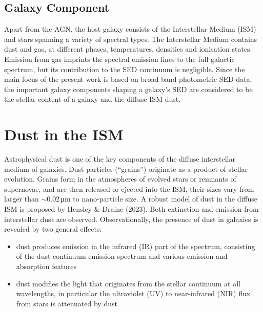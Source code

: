 \subsection{Galaxy Component}
Apart from the AGN, the host galaxy consists of the Interstellar Medium (ISM) and stars spanning a variety of spectral types\cite{Conroy2013}. The Interstellar Medium contains dust\cite{ISMDust2005}\cite{ISMDust2020} and gas\cite{ISM2022}, at different phases, temperatures, densities and ionisation states. Emission from gas imprints the spectral emission lines to the full galactic spectrum, but its contribution to the SED continuum is negligible. Since the main focus of the present work is based on broad band photometric SED data, the important galaxy components shaping a galaxy's SED are considered to be the stellar content of a galaxy and the diffuse ISM dust. 


\section{Dust in the ISM} \label{sec:SED/ISMdust}
Astrophysical dust is one of the key components of the diffuse interstellar medium of galaxies.
Dust particles (“grains”) originate as a product of stellar evolution. Grains form in the atmospheres of evolved stars or remnants of supernovae, and are then released or ejected into the ISM, their sizes vary from larger than $\sim 0.02 \, $μm to nano-particle size. A robust model of dust in the diffuse ISM is proposed by Hensley \& Draine (2023)\cite{HenDraine2023}. Both extinction and emission from interstellar dust are observed. Observationally, the presence of dust in galaxies is revealed by two general effects: 
\begin{itemize}
    \item dust produces emission in the infrared (IR) part of the spectrum, consisting of the dust continuum emission spectrum and various emission and absorption features
    \item dust modifies the light that originates from the stellar continuum at all wavelengths, in particular the ultraviolet (UV) to near-infrared (NIR) flux from stars is attenuated by dust
\end{itemize}

